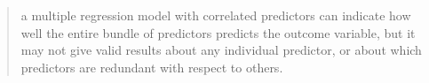 \documentclass[12pt,english]{report}
\begin{document}
\begin{quote}
 a multiple regression model with correlated predictors can indicate how well
the entire bundle
 of predictors predicts the outcome variable, but it may not give valid results
about any individual
 predictor, or about which predictors are redundant with respect to others.
 \end{quote}
 

\end{document}
